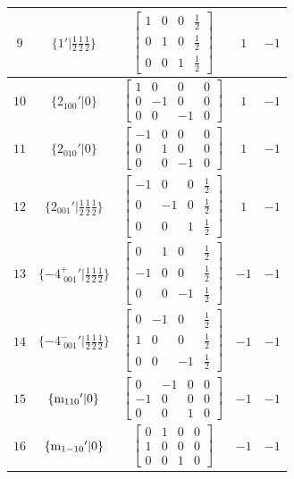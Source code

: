 \documentclass[fleqn,8pt]{jsarticle}
\begin{document}
\begin{longtable}{ccccc}
$ 9 $ & $ \{1{}'|\frac{1}{2} \frac{1}{2} \frac{1}{2}\} $ & $ \begin{bmatrix} 1 & 0 & 0 & \frac{1}{2} \\ 0 & 1 & 0 & \frac{1}{2} \\ 0 & 0 & 1 & \frac{1}{2} \end{bmatrix} $ & $ 1 $ & $ -1 $ \\ \hline
$ 10 $ & $ \{2{}_{100}{}'|0\} $ & $ \begin{bmatrix} 1 & 0 & 0 & 0 \\ 0 & -1 & 0 & 0 \\ 0 & 0 & -1 & 0 \end{bmatrix} $ & $ 1 $ & $ -1 $ \\ \hline
$ 11 $ & $ \{2{}_{010}{}'|0\} $ & $ \begin{bmatrix} -1 & 0 & 0 & 0 \\ 0 & 1 & 0 & 0 \\ 0 & 0 & -1 & 0 \end{bmatrix} $ & $ 1 $ & $ -1 $ \\ \hline
$ 12 $ & $ \{2{}_{001}{}'|\frac{1}{2} \frac{1}{2} \frac{1}{2}\} $ & $ \begin{bmatrix} -1 & 0 & 0 & \frac{1}{2} \\ 0 & -1 & 0 & \frac{1}{2} \\ 0 & 0 & 1 & \frac{1}{2} \end{bmatrix} $ & $ 1 $ & $ -1 $ \\ \hline
$ 13 $ & $ \{-4^{+}_{\,\,001}{}'|\frac{1}{2} \frac{1}{2} \frac{1}{2}\} $ & $ \begin{bmatrix} 0 & 1 & 0 & \frac{1}{2} \\ -1 & 0 & 0 & \frac{1}{2} \\ 0 & 0 & -1 & \frac{1}{2} \end{bmatrix} $ & $ -1 $ & $ -1 $ \\ \hline
$ 14 $ & $ \{-4^{-}_{\,\,001}{}'|\frac{1}{2} \frac{1}{2} \frac{1}{2}\} $ & $ \begin{bmatrix} 0 & -1 & 0 & \frac{1}{2} \\ 1 & 0 & 0 & \frac{1}{2} \\ 0 & 0 & -1 & \frac{1}{2} \end{bmatrix} $ & $ -1 $ & $ -1 $ \\ \hline
$ 15 $ & $ \{{\rm m}_{110}{}'|0\} $ & $ \begin{bmatrix} 0 & -1 & 0 & 0 \\ -1 & 0 & 0 & 0 \\ 0 & 0 & 1 & 0 \end{bmatrix} $ & $ -1 $ & $ -1 $ \\ \hline
$ 16 $ & $ \{{\rm m}_{1-10}{}'|0\} $ & $ \begin{bmatrix} 0 & 1 & 0 & 0 \\ 1 & 0 & 0 & 0 \\ 0 & 0 & 1 & 0 \end{bmatrix} $ & $ -1 $ & $ -1 $ \\
\end{longtable}
\end{document}
